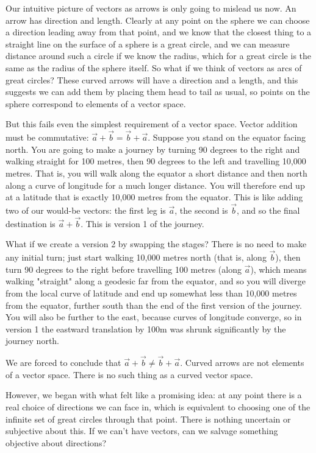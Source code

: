 Our intuitive picture of vectors as arrows is only going to mislead us now. An arrow has direction and length. Clearly at any point on the sphere we can choose a direction leading away from that point, and we know that the closest thing to a straight line on the surface of a sphere is a great circle, and we can measure distance around such a circle if we know the radius, which for a great circle is the same as the radius of the sphere itself. So what if we think of vectors as arcs of great circles? These curved arrows will have a direction and a length, and this suggests we can add them by placing them head to tail as usual, so points on the sphere correspond to elements of a vector space.

But this fails even the simplest requirement of a vector space. Vector addition must be commutative: $\vec{a} + \vec{b} = \vec{b} + \vec{a}$. Suppose you stand on the equator facing north. You are going to make a journey by turning 90 degrees to the right and walking straight for 100 metres, then 90 degrees to the left and travelling 10,000 metres. That is, you will walk along the equator a short distance and then north along a curve of longitude for a much longer distance. You will therefore end up at a latitude that is exactly 10,000 metres from the equator. This is like adding two of our would-be vectors: the first leg is $\vec{a}$, the second is $\vec{b}$, and so the final destination is $\vec{a} + \vec{b}$. This is version 1 of the journey. 

What if we create a version 2 by swapping the stages? There is no need to make any initial turn; just start walking 10,000 metres north (that is, along $\vec{b}$), then turn 90 degrees to the right before travelling 100 metres (along $\vec{a}$), which means walking "straight" along a geodesic far from the equator, and so you will diverge from the local curve of latitude and end up somewhat less than 10,000 metres from the equator, further south than the end of the first version of the journey. You will also be further to the east, because curves of longitude converge, so in version 1 the eastward translation by 100m was shrunk significantly by the journey north.

We are forced to conclude that $\vec{a} + \vec{b} \ne \vec{b} + \vec{a}$. Curved arrows are not elements of a vector space. There is no such thing as a curved vector space.

However, we began with what felt like a promising idea: at any point there is a real choice of directions we can face in, which is equivalent to choosing one of the infinite set of great circles through that point. There is nothing uncertain or subjective about this. If we can't have vectors, can we salvage something objective about directions?

